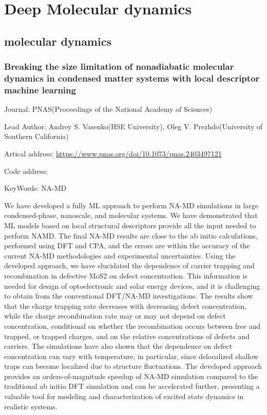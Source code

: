 \documentclass[11pt]{elegantbook}
\begin{document}
\chapter{Deep Molecular dynamics}

\section{molecular dynamics}
\subsection{Breaking the size limitation of nonadiabatic molecular dynamics in condensed matter systems with local descriptor machine learning}
\begin{brief}
    \item Journal: PNAS(Proceedings of the National Academy of Sciences)
    \item Lead Author: Andrey S. Vasenko(HSE University), Oleg V. Prezhdo(University of Southern California)
    \item Artical address: \href{https://www.pnas.org/doi/10.1073/pnas.2403497121}{https://www.pnas.org/doi/10.1073/pnas.2403497121}
    \item Code address: 
    \item KeyWords: NA-MD
\end{brief}

We have developed a fully ML approach to perform NA-MD simulations in large condensed-phase, nanoscale, and molecular systems. We have demonstrated that ML models based on local structural descriptors provide all the input needed to perform NAMD. The final NA-MD results are close to the ab initio calculations, performed using DFT and CPA, and the errors are within the accuracy of the current NA-MD methodologies and experimental uncertainties. Using the developed approach, we have elucidated the dependence of carrier trapping and recombination in defective MoS2 on defect concentration. This information is needed for design of optoelectronic and solar energy devices, and it is challenging to obtain from the conventional DFT/NA-MD investigations. The results show that the charge trapping rate decreases with decreasing defect concentration, while the charge recombination rate may or may not depend on defect concentration, conditional on whether the recombination occurs between free and trapped, or trapped charges, and on the relative concentrations of defects and carriers. The simulations have also shown that the dependence on defect concentration can vary with temperature, in particular, since delocalized shallow traps can become localized due to structure fluctuations. The developed approach provides an orders-of-magnitude speedup of NA-MD simulation compared to the traditional ab initio DFT simulation and can be accelerated further, presenting a valuable tool for modeling and characterization of excited state dynamics in realistic systems.




\end{document}
